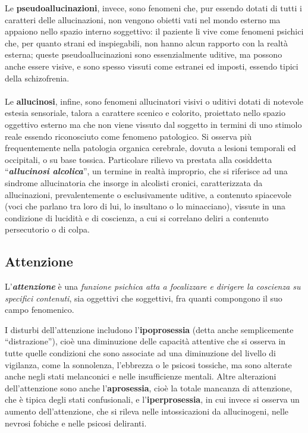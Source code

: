 Le \textbf{pseudoallucinazioni}, invece, sono fenomeni che, pur essendo
dotati di tutti i caratteri delle allucinazioni, non vengono obietti
vati nel mondo esterno ma appaiono nello spazio interno soggettivo: il
paziente li vive come fenomeni psichici che, per quanto strani ed
inspiegabili, non hanno alcun rapporto con la realtà esterna; queste
pseudoallucinazioni sono essenzialmente uditive, ma possono anche essere
visive, e sono spesso vissuti come estranei ed imposti, essendo tipici
della schizofrenia.
\\\\
Le \textbf{allucinosi}, infine, sono fenomeni allucinatori visivi o
uditivi dotati di notevole estesia sensoriale, talora a carattere
scenico e colorito, proiettato nello spazio oggettivo esterno ma che non
viene vissuto dal soggetto in termini di uno stimolo reale essendo
riconosciuto come fenomeno patologico. Si osserva più frequentemente
nella patologia organica cerebrale, dovuta a lesioni temporali ed
occipitali, o su base tossica. Particolare rilievo va prestata alla
cosiddetta ``\textbf{\emph{allucinosi alcolica}}'', un termine in realtà
improprio, che si riferisce ad una sindrome allucinatoria che insorge in
alcolisti cronici, caratterizzata da allucinazioni, prevalentemente o
esclusivamente uditive, a contenuto spiacevole (voci che parlano tra
loro di lui, lo insultano o lo minacciano), vissute in una condizione di
lucidità e di coscienza, a cui si correlano deliri a contenuto
persecutorio o di colpa.

\subsection{Attenzione}

L'\textbf{\emph{attenzione}} è una \emph{funzione psichica atta a
focalizzare e dirigere la coscienza su specifici contenuti}, sia
oggettivi che soggettivi, fra quanti compongono il suo campo fenomenico.

I disturbi dell'attenzione includono l'\textbf{ipoprosessia} (detta
anche semplicemente ``distrazione''), cioè una diminuzione delle
capacità attentive che si osserva in tutte quelle condizioni che sono
associate ad una diminuzione del livello di vigilanza, come la
sonnolenza, l'ebbrezza o le psicosi tossiche, ma sono alterate anche
negli stati melanconici e nelle insufficienze mentali. Altre alterazioni
dell'attenzione sono anche l'\textbf{aprosessia}, cioè la totale
mancanza di attenzione, che è tipica degli stati confusionali, e
l'\textbf{iperprosessia}, in cui invece si osserva un aumento
dell'attenzione, che si rileva nelle intossicazioni da allucinogeni,
nelle nevrosi fobiche e nelle psicosi deliranti.

